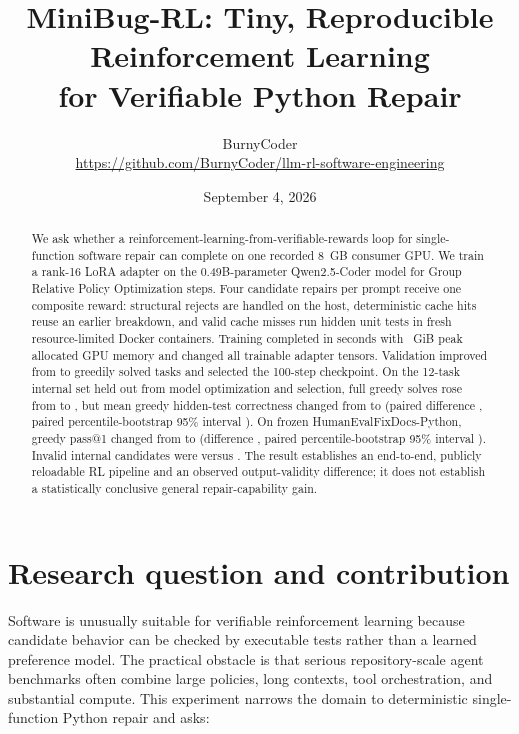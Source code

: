 \documentclass[11pt]{article}
\title{MiniBug-RL: Tiny, Reproducible Reinforcement Learning\\for Verifiable Python Repair}
\author{BurnyCoder\\\small\url{https://github.com/BurnyCoder/llm-rl-software-engineering}}
\date{September 4, 2026}
\begin{document}
\maketitle

\begin{abstract}
We ask whether a reinforcement-learning-from-verifiable-rewards loop for single-function software repair can complete on one recorded 8~GB consumer GPU. We train a rank-16 LoRA adapter on the 0.49B-parameter Qwen2.5-Coder model for \TrainSteps{} Group Relative Policy Optimization steps. Four candidate repairs per prompt receive one composite reward: structural rejects are handled on the host, deterministic cache hits reuse an earlier breakdown, and valid cache misses run hidden unit tests in fresh resource-limited Docker containers. Training completed in \TrainSeconds{} seconds with \TrainPeakGiB{}~GiB peak allocated GPU memory and changed all \ChangedTensors{} trainable adapter tensors. Validation improved from \BaseValSolved{} to \ModelValSolved{} greedily solved tasks and selected the 100-step checkpoint. On the 12-task internal set held out from model optimization and selection, full greedy solves rose from \BaseTestSolved{} to \ModelTestSolved{}, but mean greedy hidden-test correctness changed from \BaseTestHidden{} to \ModelTestHidden{} (paired difference \TestDifference{}, paired percentile-bootstrap 95\% interval \TestInterval{}). On frozen HumanEvalFixDocs-Python, greedy pass@1 changed from \BaseExternalPassed{} to \ModelExternalPassed{} (difference \ExternalDifference{}, paired percentile-bootstrap 95\% interval \ExternalInterval{}). Invalid internal candidates were \BaseInvalid{} versus \ModelInvalid{}. The result establishes an end-to-end, publicly reloadable RL pipeline and an observed output-validity difference; it does not establish a statistically conclusive general repair-capability gain.
\end{abstract}

\section{Research question and contribution}

Software is unusually suitable for verifiable reinforcement learning because candidate behavior can be checked by executable tests rather than a learned preference model. The practical obstacle is that serious repository-scale agent benchmarks often combine large policies, long contexts, tool orchestration, and substantial compute. This experiment narrows the domain to deterministic single-function Python repair and asks:
\end{document}
